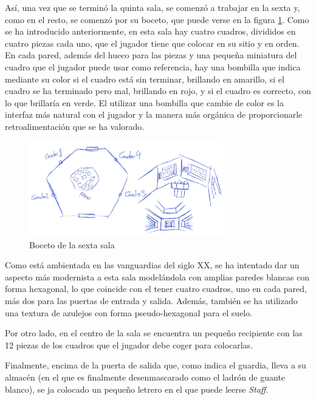 Así, una vez que se terminó la quinta sala, se comenzó a trabajar en la sexta y, como en el resto, se comenzó por su boceto, que puede verse en la figura \ref{fig:boceto-sala-6}. Como se ha introducido anteriormente, en esta sala hay cuatro cuadros, divididos en cuatro piezas cada uno, que el jugador tiene que colocar en su sitio y en orden. En cada pared, además del hueco para las piezas y una pequeña miniatura del cuadro que el jugador puede usar como referencia, hay una bombilla que indica mediante su color si el cuadro está sin terminar, brillando en amarillo, si el cuadro se ha terminado pero mal, brillando en rojo, y si el cuadro es correcto, con lo que brillaría en verde. El utilizar una bombilla que cambie de color es la interfaz más natural con el jugador y la manera más orgánica de proporcionarle retroalimentación que se ha valorado.

\begin{figure}[!h]
\begin{center}
\includegraphics[width=0.75\textwidth]{imagenes/7/bocetos/boceto-sala-6.png}
\caption{Boceto de la sexta sala}
\label{fig:boceto-sala-6}
\end{center}
\end{figure}

Como está ambientada en las vanguardias del siglo XX, se ha intentado dar un aspecto más modernista a esta sala modelándola con amplias paredes blancas con forma hexagonal, lo que coincide con el tener cuatro cuadros, uno en cada pared, más dos para las puertas de entrada y salida. Además, también se ha utilizado una textura de azulejos con forma pseudo-hexagonal para el suelo. 

Por otro lado, en el centro de la sala se encuentra un pequeño recipiente con las 12 piezas de los cuadros que el jugador debe coger para colocarlas.

Finalmente, encima de la puerta de salida que, como indica el guardia, lleva a su almacén (en el que es finalmente desenmascarado como el ladrón de guante blanco), se ja colocado un pequeño letrero en el que puede leerse \textit{Staff}.

